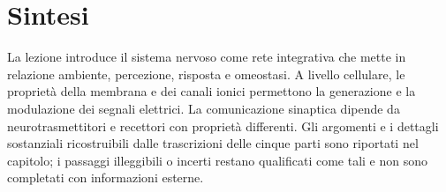\section{Sintesi}

La lezione introduce il sistema nervoso come rete integrativa che mette in relazione ambiente, percezione, risposta e omeostasi. A livello cellulare, le proprietà della membrana e dei canali ionici permettono la generazione e la modulazione dei segnali elettrici. La comunicazione sinaptica dipende da neurotrasmettitori e recettori con proprietà differenti. Gli argomenti e i dettagli sostanziali ricostruibili dalle trascrizioni delle cinque parti sono riportati nel capitolo; i passaggi illeggibili o incerti restano qualificati come tali e non sono completati con informazioni esterne.
